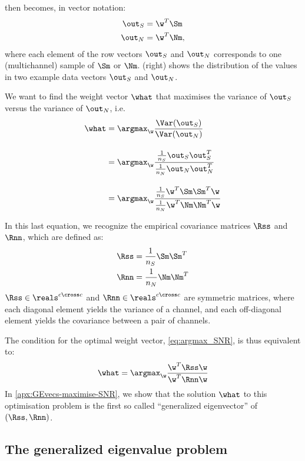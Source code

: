  then becomes, in vector notation:
%
\begin{align*}
\out_S &= \w^T \Sm \\
\out_N &= \w^T \Nm,
\end{align*}
where each element of the row vectors $\out_S$ and $\out_N$ corresponds to one (multichannel) sample of $\Sm$ or $\Nm$.  (right) shows the distribution of the values in two example data vectors $\out_S$ and $\out_N$.

We want to find the weight vector $\what$ that maximises the variance of $\out_S$ versus the variance of $\out_N$, i.e.
%
\begin{align}
\what &= \argmax_{\w} \frac{\Var(\out_S)}
                           {\Var(\out_N)}  \label{eq:argmax_SNR} \\[1em]
      &= \argmax_{\w} 
         \frac{\frac{1}{n_S} \out_S \out_S^T}
              {\frac{1}{n_N} \out_N \out_N^T}   \nonumber \\[1em]
      &= \argmax_{\w}
         \frac{\frac{1}{n_S} \w^T \Sm \Sm^T \w}
              {\frac{1}{n_N} \w^T \Nm \Nm^T \w}  \nonumber
\end{align}

In this last equation, we recognize the empirical covariance matrices $\Rss$ and $\Rnn$, which are defined as:
%
\begin{align}
\Rss &= \frac{1}{n_S} \Sm \Sm^T \label{eq:covariance_S}\\
\Rnn &= \frac{1}{n_N} \Nm \Nm^T \label{eq:covariance_N}
\end{align}
%
$\Rss \in \reals^{c \cross c}$ and $\Rnn \in \reals^{c \cross c}$ are symmetric matrices, where each diagonal element yields the variance of a channel, and each off-diagonal element yields the covariance between a pair of channels.

The condition for the optimal weight vector, \cref{eq:argmax_SNR}, is thus equivalent to:
%
\begin{equation}
\label{eq:argmax_R}
\what = \argmax_{\w}
       \frac{\w^T \Rss \w}
            {\w^T \Rnn \w}
\end{equation}
%
In \cref{apx:GEvecs-maximise-SNR}, we show that the solution $\what$ to this optimisation problem is the first so called ``generalized eigenvector'' of $(\Rss, \Rnn)$.



\subsection{The generalized eigenvalue problem}
\label{sec:generalized-eig-problem}


